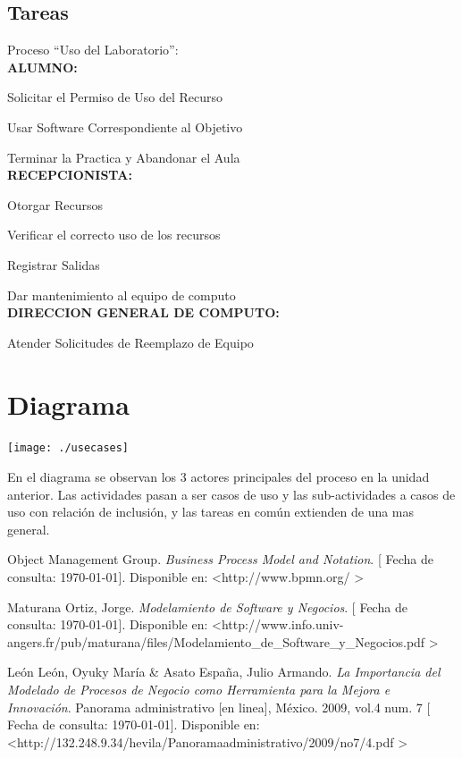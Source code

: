 \documentclass[spanish,12pt,letterpapper]{article}
\begin{document}
	\subsection{Tareas}
	Proceso ``Uso del Laboratorio'':\\
	
	\textbf{ALUMNO:}
	
	Solicitar el Permiso de Uso del Recurso
	
	Usar Software Correspondiente al Objetivo
	
	Terminar la Practica y Abandonar el Aula\\
	
	\textbf{RECEPCIONISTA:}
	
	Otorgar Recursos
	
	Verificar el correcto uso de los recursos
	
	Registrar Salidas
	
	Dar mantenimiento al equipo de computo\\
	
	\textbf{DIRECCION GENERAL DE COMPUTO:}
	
	Atender Solicitudes de Reemplazo de Equipo
	
	\section{Diagrama}
	\begin{center}
	\texttt{[image: ./usecases]}~\\[1cm]
	\end{center}
	
	En el diagrama se observan los 3 actores principales del proceso en la unidad anterior. Las actividades pasan a ser casos de uso y las sub-actividades a casos de uso con relación de inclusión, y las tareas en común extienden de una mas general.
	
	\pagebreak
	\begin{thebibliography}{9}
	 Object Management Group. 
		\emph{Business Process Model and Notation}. {[} Fecha de consulta: \today {]}. Disponible en: \textless http://www.bpmn.org/ \textgreater	
	
		 Maturana Ortiz, Jorge. 
		\emph{Modelamiento de Software y Negocios}. {[} Fecha de consulta: \today {]}. Disponible en: \textless http://www.info.univ-angers.fr/pub/maturana/files/Modelamiento\_de\_Software\_y\_Negocios.pdf \textgreater
		
		 León León, Oyuky María \& Asato España, Julio Armando. 
		\emph{La Importancia del Modelado de Procesos de
			Negocio como Herramienta para la Mejora e
			Innovación}. Panorama administrativo {[}en linea{]}, México. 2009, vol.4 num. 7  {[} Fecha de consulta: \today {]}. Disponible en: \textless http://132.248.9.34/hevila/Panoramaadministrativo/2009/no7/4.pdf \textgreater
	\end{thebibliography}
\end{document}
